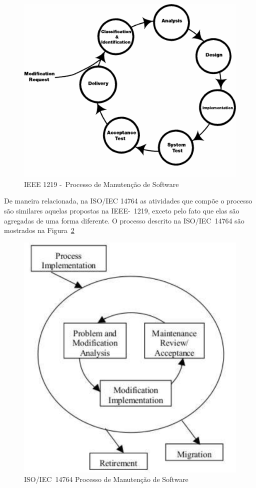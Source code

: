 \begin{figure}[htpb]
	\centering
	\includegraphics[width=0.8\linewidth]{chapter-manutencao-software-visao-geral/img/ieee-1219-98-processo-manutencao.png}
	\caption{IEEE 1219 -~Processo de Manutenção de Software}
	\label{fig:ieee-1219-processo-man-software}
\end{figure}

De maneira relacionada, na ISO/IEC 14764 as atividades que compõe o processo são similares aquelas
propostas na IEEE-~1219, exceto pelo fato que elas são agregadas de uma forma diferente. O processo
descrito na ISO/IEC~14764 são mostrados na Figura~\ref{fig:ieee-14764-processo-manutencao}

\begin{figure}[htpb]
	\centering
	\includegraphics[width=0.8\linewidth]{chapter-manutencao-software-visao-geral/img/ieee-14764-processo-manutencao.pdf}
	\caption{ISO/IEC~14764 Processo de Manutenção de Software}
	\label{fig:ieee-14764-processo-manutencao}
\end{figure}



